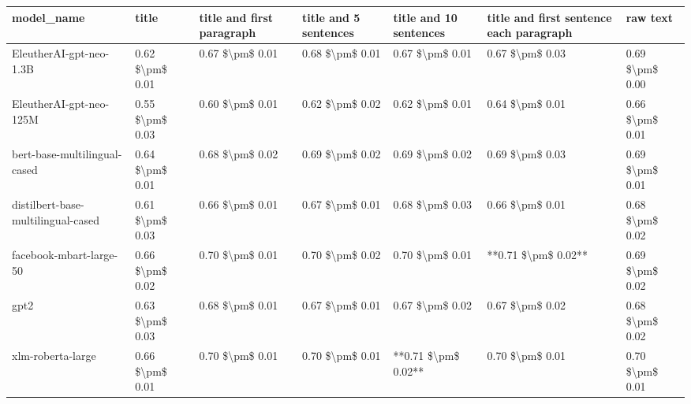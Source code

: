 \begin{tabular}{lllllll}
\toprule
                        model\_name &           title & title and first paragraph & title and 5 sentences & title and 10 sentences & title and first sentence each paragraph &        raw text \\
\midrule
           EleutherAI-gpt-neo-1.3B & 0.62 \$\textbackslash pm\$ 0.01 &           0.67 \$\textbackslash pm\$ 0.01 &       0.68 \$\textbackslash pm\$ 0.01 &        0.67 \$\textbackslash pm\$ 0.01 &                         0.67 \$\textbackslash pm\$ 0.03 & 0.69 \$\textbackslash pm\$ 0.00 \\
           EleutherAI-gpt-neo-125M & 0.55 \$\textbackslash pm\$ 0.03 &           0.60 \$\textbackslash pm\$ 0.01 &       0.62 \$\textbackslash pm\$ 0.02 &        0.62 \$\textbackslash pm\$ 0.01 &                         0.64 \$\textbackslash pm\$ 0.01 & 0.66 \$\textbackslash pm\$ 0.01 \\
      bert-base-multilingual-cased & 0.64 \$\textbackslash pm\$ 0.01 &           0.68 \$\textbackslash pm\$ 0.02 &       0.69 \$\textbackslash pm\$ 0.02 &        0.69 \$\textbackslash pm\$ 0.02 &                         0.69 \$\textbackslash pm\$ 0.03 & 0.69 \$\textbackslash pm\$ 0.01 \\
distilbert-base-multilingual-cased & 0.61 \$\textbackslash pm\$ 0.03 &           0.66 \$\textbackslash pm\$ 0.01 &       0.67 \$\textbackslash pm\$ 0.01 &        0.68 \$\textbackslash pm\$ 0.03 &                         0.66 \$\textbackslash pm\$ 0.01 & 0.68 \$\textbackslash pm\$ 0.02 \\
           facebook-mbart-large-50 & 0.66 \$\textbackslash pm\$ 0.02 &           0.70 \$\textbackslash pm\$ 0.01 &       0.70 \$\textbackslash pm\$ 0.02 &        0.70 \$\textbackslash pm\$ 0.01 &                     **0.71 \$\textbackslash pm\$ 0.02** & 0.69 \$\textbackslash pm\$ 0.02 \\
                              gpt2 & 0.63 \$\textbackslash pm\$ 0.03 &           0.68 \$\textbackslash pm\$ 0.01 &       0.67 \$\textbackslash pm\$ 0.01 &        0.67 \$\textbackslash pm\$ 0.02 &                         0.67 \$\textbackslash pm\$ 0.02 & 0.68 \$\textbackslash pm\$ 0.02 \\
                 xlm-roberta-large & 0.66 \$\textbackslash pm\$ 0.01 &           0.70 \$\textbackslash pm\$ 0.01 &       0.70 \$\textbackslash pm\$ 0.01 &    **0.71 \$\textbackslash pm\$ 0.02** &                         0.70 \$\textbackslash pm\$ 0.01 & 0.70 \$\textbackslash pm\$ 0.01 \\
\bottomrule
\end{tabular}
